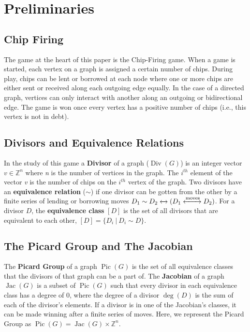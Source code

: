 \documentclass[11pt,reqno]{amsart}
\DeclareMathOperator{\Pic}{Pic}
\DeclareMathOperator{\Jac}{Jac}
\DeclareMathOperator{\Div}{Div}
\DeclareMathOperator{\Deg}{deg}
\theoremstyle{definition}
\theoremstyle{plain}
\begin{document}
\section{Preliminaries}

	\subsection{Chip Firing}
		The game at the heart of this paper is the Chip-Firing game. When a game is started, each vertex on
		a graph is assigned a certain number of chips.  During play, chips can be lent or borrowed at each
		node where one or more chips are either sent or received along each outgoing edge equally.  In the
		case of a directed graph, vertices can only interact with another along an outgoing or
		bidirectional edge.  The game is won once every vertex has a positive number of chips (i.e., this
		vertex is not in debt).

	\subsection{Divisors and Equivalence Relations}
		In the study of this game a \textbf{Divisor} of a graph ($\Div(G)$) is an integer vector $v\in\mathbb{Z}^n$
		where \textit{n} is the number of vertices in the graph.  The $i^{th}$ element of the vector \textit{v}
		is the number of chips on the $i^{th}$ vertex of the graph.  Two divisors have an \textbf{equivalence relation}
		($\sim$) if one divisor can be gotten from the other by a finite series of lending or borrowing moves
		$D_1 \sim D_2 \xleftrightarrow{} (D_1 \xleftrightarrow{\text{moves}} D_2)$.  For a divisor $D$, the \textbf{equivalence class} {$[D]$}
		is the set of all divisors that are equivalent to each other, $[D] = \{D_i~|~D_i \sim D\}$.

	\subsection{The Picard Group and The Jacobian}
		The \textbf{Picard Group} of a graph $\Pic(G)$ is the set of all equivalence classes that the
		divisors of that graph can be a  part of. The \textbf{Jacobian} of a graph  $\Jac(G)$ is a subset
		of $\Pic(G)$ such that every divisor in each equivalence class has a degree of $0$, where the
		degree of a divisor $\Deg(D)$ is the sum of each of the divisor's elements.
		If a divisor is in one of the Jacobian's classes, it can be made winning after a finite series of moves.
		Here, we represent the Picard Group as $\Pic(G)=\Jac(G)\times\mathbb{Z}^n$.
\end{document}
